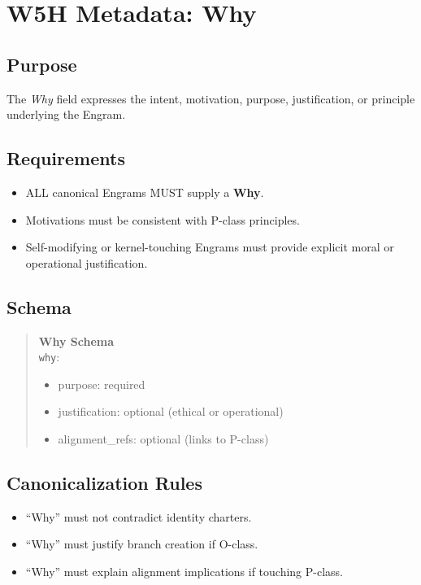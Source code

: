 \chapter{W5H Metadata: Why}
\label{chap:W5H_Why}

\section{Purpose}

The \emph{Why} field expresses the intent, motivation, purpose, justification, 
or principle underlying the Engram.

\section{Requirements}

\begin{itemize}
    \item ALL canonical Engrams MUST supply a \textbf{Why}.
    \item Motivations must be consistent with P-class principles.
    \item Self-modifying or kernel-touching Engrams must provide explicit moral
          or operational justification.
\end{itemize}

\section{Schema}

\begin{quote}
\textbf{Why Schema}\\
\texttt{why}: 
\begin{itemize}
    \item purpose: required
    \item justification: optional (ethical or operational)
    \item alignment\_refs: optional (links to P-class)
\end{itemize}
\end{quote}

\section{Canonicalization Rules}

\begin{itemize}
    \item ``Why'' must not contradict identity charters.
    \item ``Why'' must justify branch creation if O-class.
    \item ``Why'' must explain alignment implications if touching P-class.
\end{itemize}
